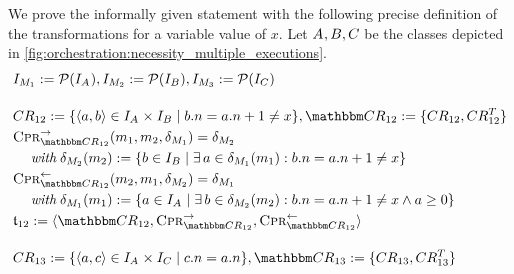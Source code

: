 We prove the informally given statement with the following precise definition of the transformations for a variable value of $x$.
Let $A_{}, B_{}, C_{}$ be the classes depicted in \autoref{fig:orchestration:necessity_multiple_executions}.
\begin{align*}
    & 
    \metamodelinstanceset{M}{1} \equalsperdefinition \mathcal{P}(\instances{\class{A}{}}), %
    \metamodelinstanceset{M}{2} \equalsperdefinition \mathcal{P}(\instances{\class{B}{}}), %
    \metamodelinstanceset{M}{3} \equalsperdefinition \mathcal{P}(\instances{\class{C}{}}) \\[1em]
    &
    \consistencyrelation{CR}{12} \equalsperdefinition \setted{\tupled{a,b} \in \instances{\class{A}{}} \times \instances{\class{B}{}} \mid b.n = a.n + 1 \neq x}, \consistencyrelationset{CR}_{12} \equalsperdefinition \setted{\consistencyrelation{CR}{12}, \consistencyrelation{CR}{12}^T} \\
    &
    \consistencypreservationrule{\consistencyrelationset{CR}_{12}}^{\rightarrow}(\model{m}{1}, \model{m}{2}, \change{\metamodel{M}{1}}) = \change{\metamodel{M}{2}} \\
    & \formulaskip
    \withmath \change{\metamodel{M}{2}}(\model{m}{2}) \equalsperdefinition \setted{b \in \instances{\class{B}{}} \mid \exists a \in \change{\metamodel{M}{1}}(\model{m}{1}) : b.n = a.n + 1 \neq x} \\
    & 
    \consistencypreservationrule{\consistencyrelationset{CR}_{12}}^{\leftarrow}(\model{m}{2}, \model{m}{1}, \change{\metamodel{M}{2}}) = \change{\metamodel{M}{1}} \\
    & \formulaskip
    \withmath \change{\metamodel{M}{1}}(\model{m}{1}) \equalsperdefinition \setted{a \in \instances{\class{A}{}} \mid \exists b \in \change{\metamodel{M}{2}}(\model{m}{2}) : b.n = a.n + 1 \neq x \land a \geq 0} \\
    &
    \transformation{t}_{12} \equalsperdefinition \tupled{\consistencyrelationset{CR}_{12}, \consistencypreservationrule{\consistencyrelationset{CR}_{12}}^{\rightarrow}, \consistencypreservationrule{\consistencyrelationset{CR}_{12}}^{\leftarrow}} \\[1em]
    & 
    \consistencyrelation{CR}{13} \equalsperdefinition \setted{\tupled{a,c} \in \instances{\class{A}{}} \times \instances{\class{C}{}} \mid c.n = a.n}, \consistencyrelationset{CR}_{13} \equalsperdefinition \setted{\consistencyrelation{CR}{13}, \consistencyrelation{CR}{13}^T} \\

\end{align*}
